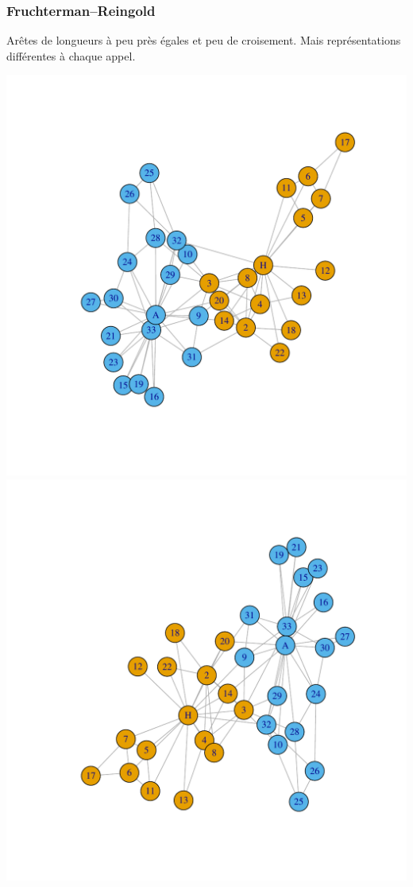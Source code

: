 \documentclass[nopagenumber,9pt]{beamer}
\begin{document}
\begin{frame}
 \frametitle{Fruchterman–Reingold}
 Ar\^etes de longueurs à peu près égales et peu de croisement. Mais représentations différentes à chaque appel.
 
 
  \begin{center}
 \includegraphics[scale=.3]{plots/karateFR1.pdf}
  \includegraphics[scale=.3]{plots/karateFR2.pdf}
  
 \end{center}
 
\end{frame}
\end{document}
